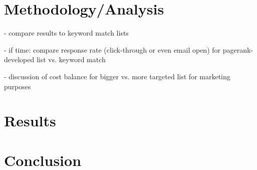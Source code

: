 \documentclass[]{report}   %
\begin{document}
\chapter{Methodology/Analysis}

- compare results to keyword match lists

- if time: compare response rate (click-through or even email open) for pagerank-developed list vs. keyword match

- discussion of cost balance for bigger vs. more targeted list for marketing purposes


\chapter{Results}
\chapter{Conclusion}        

\appendix
\appendixpage
\addappheadtotoc
\end{document}
